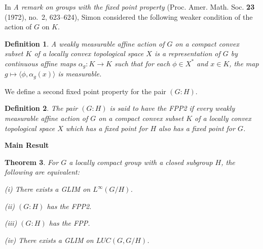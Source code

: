\documentclass[landscape]{slides}
\newtheorem{defn}{Definition}
\newtheorem{theorem}[defn]{Theorem}
\begin{document}
\begin{slide}
In \emph{A remark on groups with the fixed point property} (Proc. Amer.
  Math. Soc. \textbf{23} (1972), no.~2, 623--624),
Simon considered the following weaker condition of the action of $G$ on $K$.\\
\begin{defn}
A {\it weakly measurable affine action} of $G$ on a compact convex subset $K$ of a locally
convex topological space $X$ is a representation of $G$ by continuous affine maps
$\alpha_g : K \rightarrow K$ such that for each $\phi \in X^*$ and $x\in K$, the map
$g\mapsto \langle\phi, \alpha_g (x)\rangle$ is measurable.
\end{defn}

We define a second fixed point property for the pair $(G:H)$.\\
\begin{defn}
The pair $(G:H)$ is said to have the
FPP2 if every weakly
measurable affine action of $G$ on a compact convex subset $K$ of a locally convex
topological space $X$ which has a fixed point for $H$ also has a fixed point for $G$.
\end{defn}
\end{slide}

\begin{slide}
{\bf Main Result}\\
\begin{theorem}
For $G$ a locally compact group with a closed subgroup $H$, the following are equivalent:
\begin{list}{}{\itemsep -6pt \topsep -8pt}
\item[(i)] There exists a GLIM on $L^\infty (G/H)$.
\item[(ii)] $(G:H)$ has the FPP2.
\item[(iii)] $(G:H)$ has the FPP.
\item[(iv)] There exists a GLIM on $LUC(G,G/H)$.
\end{list}
\end{theorem}

\end{slide}
\end{document}
